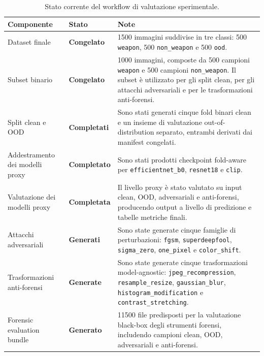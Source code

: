 \begin{table}[H]
\centering
\caption{Stato corrente del workflow di valutazione sperimentale.}
\label{tab:results-evaluation-status}
\begin{tabularx}{\textwidth}{@{}l l X@{}}
\toprule
\textbf{Componente} & \textbf{Stato} & \textbf{Note} \\
\midrule

Dataset finale
&
\textbf{Congelato}
&
1500 immagini suddivise in tre classi: 500 \texttt{weapon}, 500
\texttt{non\_weapon} e 500 \texttt{ood}. \\

Subset binario
&
\textbf{Congelato}
&
1000 immagini, composte da 500 campioni \texttt{weapon} e 500 campioni
\texttt{non\_weapon}. Il subset è utilizzato per gli split clean, per gli
attacchi adversariali e per le trasformazioni anti-forensi. \\

Split clean e OOD
&
\textbf{Completati}
&
Sono stati generati cinque fold binari clean e un insieme di valutazione
out-of-distribution separato, entrambi derivati dai manifest congelati. \\

Addestramento dei modelli proxy
&
\textbf{Completato}
&
Sono stati prodotti checkpoint fold-aware per \texttt{efficientnet\_b0},
\texttt{resnet18} e \texttt{clip}. \\

Valutazione dei modelli proxy
&
\textbf{Completata}
&
Il livello proxy è stato valutato su input clean, OOD, adversariali e
anti-forensi, producendo output a livello di predizione e tabelle metriche
finali. \\

Attacchi adversariali
&
\textbf{Generati}
&
Sono state generate cinque famiglie di perturbazioni: \texttt{fgsm},
\texttt{superdeepfool}, \texttt{sigma\_zero}, \texttt{one\_pixel} e
\texttt{color\_shift}. \\

Trasformazioni anti-forensi
&
\textbf{Generate}
&
Sono state generate cinque trasformazioni model-agnostic:
\texttt{jpeg\_recompression}, \texttt{resample\_resize},
\texttt{gaussian\_blur}, \texttt{histogram\_modification} e
\texttt{contrast\_stretching}. \\

Forensic evaluation bundle
&
\textbf{Generato}
&
11500 file predisposti per la valutazione black-box degli strumenti forensi,
includendo campioni clean, OOD, adversariali e anti-forensi. \\


\end{tabularx}
\end{table}
